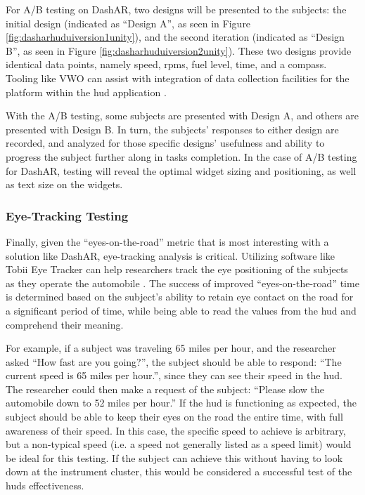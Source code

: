                 \par For A/B testing on DashAR, two designs will be presented to the subjects: the initial design (indicated as ``Design A'', as seen in Figure \ref{fig:dasharhuduiversion1unity}), and the second iteration (indicated as ``Design B'', as seen in Figure \ref{fig:dasharhuduiversion2unity}). These two designs provide identical data points, namely speed, \glspl{rpm}, fuel level, time, and a compass. Tooling like VWO can assist with integration of data collection facilities for the platform within the \gls{hud} application \cite{Wingify2025}.

                \par With the A/B testing, some subjects are presented with Design A, and others are presented with Design B. In turn, the subjects' responses to either design are recorded, and analyzed for those specific designs' usefulness and ability to progress the subject further along in tasks completion. In the case of A/B testing for DashAR, testing will reveal the optimal widget sizing and positioning, as well as text size on the widgets.

            \subsubsection{Eye-Tracking Testing}
                \par Finally, given the ``eyes-on-the-road'' metric that is most interesting with a solution like DashAR, eye-tracking analysis is critical. Utilizing software like Tobii Eye Tracker can help researchers track the eye positioning of the subjects as they operate the automobile \cite{Tobii2025}. The success of improved ``eyes-on-the-road'' time is determined based on the subject's ability to retain eye contact on the road for a significant period of time, while being able to read the values from the \gls{hud} and comprehend their meaning.

                \par For example, if a subject was traveling 65 miles per hour, and the researcher asked ``How fast are you going?'', the subject should be able to respond: ``The current speed is 65 miles per hour.'', since they can see their speed in the \gls{hud}. The researcher could then make a request of the subject: ``Please slow the automobile down to 52 miles per hour.'' If the \gls{hud} is functioning as expected, the subject should be able to keep their eyes on the road the entire time, with full awareness of their speed. In this case, the specific speed to achieve is arbitrary, but a non-typical speed (i.e. a speed not generally listed as a speed limit) would be ideal for this testing. If the subject can achieve this without having to look down at the instrument cluster, this would be considered a successful test of the \glspl{hud} effectiveness.

